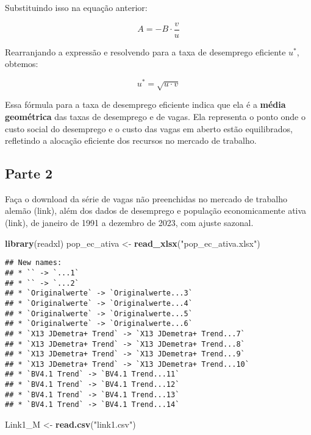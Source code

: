 \documentclass[
]{article}
\newenvironment{Shaded}{\begin{snugshade}}{\end{snugshade}}
\newcommand{\FunctionTok}[1]{\textcolor[rgb]{0.13,0.29,0.53}{\textbf{#1}}}
\newcommand{\NormalTok}[1]{#1}
\newcommand{\OtherTok}[1]{\textcolor[rgb]{0.56,0.35,0.01}{#1}}
\newcommand{\StringTok}[1]{\textcolor[rgb]{0.31,0.60,0.02}{#1}}
\begin{document}
Substituindo isso na equação anterior:

\[
A = -B \cdot \frac{v}{u}
\]

Rearranjando a expressão e resolvendo para a taxa de desemprego
eficiente \(u^*\), obtemos:

\[
u^* = \sqrt{u \cdot v}
\]

Essa fórmula para a taxa de desemprego eficiente indica que ela é a
\textbf{média geométrica} das taxas de desemprego e de vagas. Ela
representa o ponto onde o custo social do desemprego e o custo das vagas
em aberto estão equilibrados, refletindo a alocação eficiente dos
recursos no mercado de trabalho.

\subsection{Parte 2}\label{parte-2}

Faça o download da série de vagas não preenchidas no mercado de trabalho
alemão (link), além dos dados de desemprego e população economicamente
ativa (link), de janeiro de 1991 a dezembro de 2023, com ajuste sazonal.

\begin{Shaded}
\begin{Highlighting}[]
\FunctionTok{library}\NormalTok{(readxl)}
\NormalTok{pop\_ec\_ativa }\OtherTok{\textless{}{-}} \FunctionTok{read\_xlsx}\NormalTok{(}\StringTok{"pop\_ec\_ativa.xlsx"}\NormalTok{)}
\end{Highlighting}
\end{Shaded}

\begin{verbatim}
## New names:
## * `` -> `...1`
## * `` -> `...2`
## * `Originalwerte` -> `Originalwerte...3`
## * `Originalwerte` -> `Originalwerte...4`
## * `Originalwerte` -> `Originalwerte...5`
## * `Originalwerte` -> `Originalwerte...6`
## * `X13 JDemetra+ Trend` -> `X13 JDemetra+ Trend...7`
## * `X13 JDemetra+ Trend` -> `X13 JDemetra+ Trend...8`
## * `X13 JDemetra+ Trend` -> `X13 JDemetra+ Trend...9`
## * `X13 JDemetra+ Trend` -> `X13 JDemetra+ Trend...10`
## * `BV4.1 Trend` -> `BV4.1 Trend...11`
## * `BV4.1 Trend` -> `BV4.1 Trend...12`
## * `BV4.1 Trend` -> `BV4.1 Trend...13`
## * `BV4.1 Trend` -> `BV4.1 Trend...14`
\end{verbatim}

\begin{Shaded}
\begin{Highlighting}[]
\NormalTok{Link1\_M }\OtherTok{\textless{}{-}} \FunctionTok{read.csv}\NormalTok{(}\StringTok{"link1.csv"}\NormalTok{)}
\end{Highlighting}
\end{Shaded}
\end{document}
